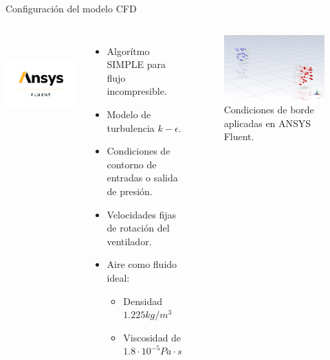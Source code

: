 \begin{frame}{Configuración del modelo CFD}
    \begin{columns}
        \centering
        \includegraphics[height=0.3\textwidth]{dump/fluent.png}
    \begin{itemize}
        \item Algorítmo SIMPLE para flujo incompresible.
        \item Modelo de turbulencia $k-\epsilon$.
        \item Condiciones de contorno de entradas o salida de presión.
        \item Velocidades fijas de rotación del ventilador.
        \item Aire como fluido ideal:
        \begin{itemize}
            \item Densidad $1.225 kg/m^3$
            \item Viscosidad de $1.8\cdot 10^{-5} Pa\cdot s$
        \end{itemize}
    \end{itemize}
    \begin{block}{}
            \begin{figure}[ht!]
                \centering
                \includegraphics[width=\textwidth]{dump/borde.png}
                \caption{Condiciones de borde aplicadas en ANSYS Fluent.}
            \end{figure}
        \end{block}  
    \end{columns}
\end{frame}

